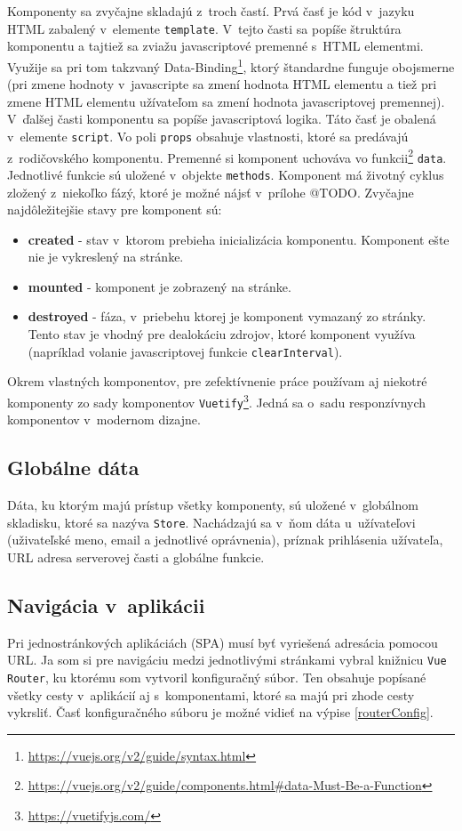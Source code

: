 \documentclass[slovak]{fitthesis}
\begin{document}
Komponenty sa zvyčajne skladajú z~troch častí. Prvá časť je kód v~jazyku HTML zabalený v~elemente \texttt{template}. V~tejto časti sa popíše štruktúra komponentu a tajtiež sa zviažu javascriptové premenné s~HTML elementmi. Využije sa pri tom takzvaný Data-Binding\footnote{\url{https://vuejs.org/v2/guide/syntax.html}}, ktorý štandardne funguje obojsmerne (pri zmene hodnoty v~javascripte sa zmení hodnota HTML elementu a tiež pri zmene HTML elementu užívateľom sa zmení hodnota javascriptovej premennej). V~ďalšej časti komponentu sa popíše javascriptová logika. Táto časť je obalená v~elemente \texttt{script}. Vo poli \texttt{props} obsahuje vlastnosti, ktoré sa predávajú z~rodičovského komponentu. Premenné si komponent uchováva vo funkcii\footnote{\url{https://vuejs.org/v2/guide/components.html\#data-Must-Be-a-Function}} \texttt{data}. Jednotlivé funkcie sú uložené v~objekte \texttt{methods}. Komponent má životný cyklus zložený z~niekoľko fázý, ktoré je možné nájsť v~prílohe @TODO. Zvyčajne najdôležitejšie stavy pre komponent sú:
\begin{itemize}
    \item \textbf{created} - stav v~ktorom prebieha inicializácia komponentu. Komponent ešte nie je vykreslený na stránke.
    \item \textbf{mounted} - komponent je zobrazený na stránke.
    \item \textbf{destroyed} - fáza, v~priebehu ktorej je komponent vymazaný zo stránky. Tento stav je vhodný pre dealokáciu zdrojov, ktoré komponent využíva (napríklad volanie javascriptovej funkcie \texttt{clearInterval}).
\end{itemize}


Okrem vlastných komponentov, pre zefektívnenie práce používam aj niekotré komponenty zo sady komponentov \texttt{Vuetify}\footnote{\url{https://vuetifyjs.com/}}. Jedná sa o~sadu responzívnych komponentov v~modernom dizajne.

\subsection{Globálne dáta}
Dáta, ku ktorým majú prístup všetky komponenty, sú uložené v~globálnom skladisku, ktoré sa nazýva \texttt{Store}. Nachádzajú sa v~ňom dáta u~užívateľovi (uživateľské meno, email a jednotlivé oprávnenia), príznak prihlásenia užívateľa, URL adresa serverovej časti a globálne funkcie.

\subsection{Navigácia v~aplikácii}
Pri jednostránkových aplikáciách (SPA) musí byť vyriešená adresácia pomocou URL. Ja som si pre navigáciu medzi jednotlivými stránkami vybral knižnicu \texttt{Vue Router}, ku ktorému som vytvoril konfiguračný súbor. Ten obsahuje popísané všetky cesty v~aplikácií aj s~komponentami, ktoré sa majú pri zhode cesty vykrsliť. Časť konfiguračného súboru je možné vidieť na výpise \ref{routerConfig}.
\end{document}
